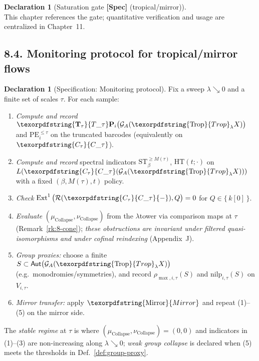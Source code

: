 \documentclass[11pt]{article}
\numberwithin{equation}{section}
\theoremstyle{plain}
\theoremstyle{definition}
\theoremstyle{remark}
\DeclareMathOperator{\Ext}{Ext}
\DeclareRobustCommand{\hyp}{\nobreakdash-}
\newcommand{\Rfun}{\mathcal{R}}
\theoremstyle{plain}
\theoremstyle{definition}
\numberwithin{equation}{section}
\theoremstyle{definition}
\newtheorem{declaration}[theorem]{Declaration}
\DeclareRobustCommand{\Ttau}{\texorpdfstring{\ensuremath{\mathbf{T}_{\tau}}}{T\_\tau}}
\DeclareRobustCommand{\Ctau}{\texorpdfstring{\ensuremath{C_{\tau}}}{C\_\tau}}
\DeclareRobustCommand{\Qtest}{\{\,k[0]\,\}}
\DeclareRobustCommand{\Trop}{\texorpdfstring{\ensuremath{\operatorname{Trop}}}{Trop}}
\DeclareRobustCommand{\Mirror}{\texorpdfstring{\ensuremath{\operatorname{Mirror}}}{Mirror}}
\numberwithin{equation}{section}
\theoremstyle{plain}
\theoremstyle{definition}
\theoremstyle{remark}
\providecommand{\Cfun}[1]{\mathsf{C}_{#1}}
\providecommand{\Tfun}[1]{\mathbf{T}_{#1}}
\providecommand{\Ctau}{\Cfun{\tau}}
\providecommand{\Ttau}{\Tfun{\tau}}
\begin{document}
\begin{declaration}[Saturation gate \textbf{[Spec]} (tropical/mirror)]
\[\]
This chapter references the gate; quantitative verification and usage are centralized in Chapter~11.
\end{declaration}

\subsection*{8.4. Monitoring protocol for tropical/mirror flows}
\begin{declaration}[Specification: Monitoring protocol]\label{spec:prot}
Fix a sweep \(\lambda\searrow 0\) and a finite set of scales \(\tau\).
For each sample:
\begin{enumerate}
  \item \emph{Compute and record} \(\Ttau\mathbf{P}_i\big(\mathcal{G}_A(\Trop_\lambda X)\big)\) and \(\mathrm{PE}_i^{\le\tau}\) on the truncated barcodes (equivalently on \(\Ctau\)).
  \item \emph{Compute and record} spectral indicators \(\mathrm{ST}_{\beta}^{\ge M(\tau)}\), \(\mathrm{HT}(t;\cdot)\) on \(L(\Ctau(\mathcal{G}_A(\Trop_\lambda X)))\) with a fixed \((\beta,M(\tau),t)\) policy.
  \item \emph{Check} \(\Ext^1\big(\Rfun(\Ctau{-}),Q\big)=0\) for \(Q\in\Qtest\).
  \item \emph{Evaluate} \((\mu_{\mathrm{Collapse}},\nu_{\mathrm{Collapse}})\) from the \(\lambda\)\nobreakdash tower via comparison maps at \(\tau\) (Remark~\ref{rk:8-cone}); \emph{these obstructions are invariant under filtered quasi\hyp isomorphisms and under cofinal reindexing} (Appendix~J).
  \item \emph{Group proxies:} choose a finite \(S\subset\mathsf{Aut}\big(\mathcal{G}_A(\Trop_\lambda X)\big)\) (e.g.\ monodromies/symmetries), and record \(\rho_{\max,i,\tau}(S)\) and \(\mathrm{nilp}_{i,\tau}(S)\) on \(V_{i,\tau}\).
  \item \emph{Mirror transfer:} apply \(\Mirror\) and repeat (1)–(5) on the mirror side.
\end{enumerate}
The \emph{stable regime} at \(\tau\) is where \((\mu_{\mathrm{Collapse}},\nu_{\mathrm{Collapse}})=(0,0)\) and indicators in (1)–(3) are non\hyp increasing along \(\lambda\searrow 0\);
\emph{weak group collapse} is declared when (5) meets the thresholds in Def.~\ref{def:group-proxy}.
\end{declaration}
\end{document}
